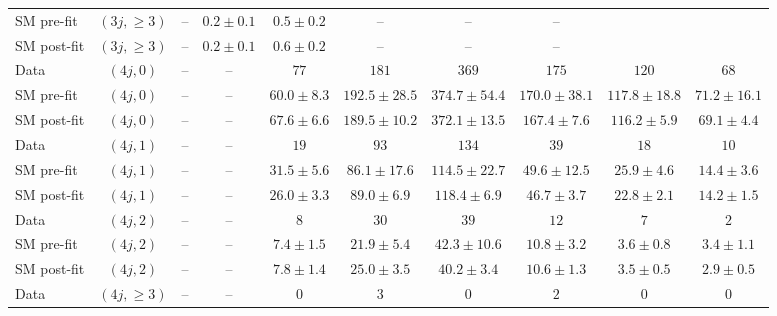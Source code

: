 \begin{table}[h!]
{\begin{tabular}{lccccccccc}
 SM pre-fit  & $(3j,\geq 3)$      & --               & $0.2\pm0.1$      & $0.5\pm0.2$    & --             & --             & --                                              \\[0.5ex]
 SM post-fit & $(3j,\geq 3)$      & --               & $0.2\pm0.1$      & $0.6\pm0.2$    & --             & --             & --                                              \\[0.5ex]
 Data        & $(4j,0)$           & --               & --               & $77$           & $181$          & $369$          & $175$          & $120$          & $68$          \\[0.5ex]
 SM pre-fit  & $(4j,0)$           & --               & --               & $60.0\pm8.3$   & $192.5\pm28.5$ & $374.7\pm54.4$ & $170.0\pm38.1$ & $117.8\pm18.8$ & $71.2\pm16.1$ \\[0.5ex]
 SM post-fit & $(4j,0)$           & --               & --               & $67.6\pm6.6$   & $189.5\pm10.2$ & $372.1\pm13.5$ & $167.4\pm7.6$  & $116.2\pm5.9$  & $69.1\pm4.4$  \\[0.5ex]
 Data        & $(4j,1)$           & --               & --               & $19$           & $93$           & $134$          & $39$           & $18$           & $10$          \\[0.5ex]
 SM pre-fit  & $(4j,1)$           & --               & --               & $31.5\pm5.6$   & $86.1\pm17.6$  & $114.5\pm22.7$ & $49.6\pm12.5$  & $25.9\pm4.6$   & $14.4\pm3.6$  \\[0.5ex]
 SM post-fit & $(4j,1)$           & --               & --               & $26.0\pm3.3$   & $89.0\pm6.9$   & $118.4\pm6.9$  & $46.7\pm3.7$   & $22.8\pm2.1$   & $14.2\pm1.5$  \\[0.5ex]
 Data        & $(4j,2)$           & --               & --               & $8$            & $30$           & $39$           & $12$           & $7$            & $2$           \\[0.5ex]
 SM pre-fit  & $(4j,2)$           & --               & --               & $7.4\pm1.5$    & $21.9\pm5.4$   & $42.3\pm10.6$  & $10.8\pm3.2$   & $3.6\pm0.8$    & $3.4\pm1.1$   \\[0.5ex]
 SM post-fit & $(4j,2)$           & --               & --               & $7.8\pm1.4$    & $25.0\pm3.5$   & $40.2\pm3.4$   & $10.6\pm1.3$   & $3.5\pm0.5$    & $2.9\pm0.5$   \\[0.5ex]
 Data        & $(4j,\geq 3)$      & --               & --               & $0$            & $3$            & $0$            & $2$            & $0$            & $0$           \\[0.5ex]

\end{tabular}}
\end{table}
